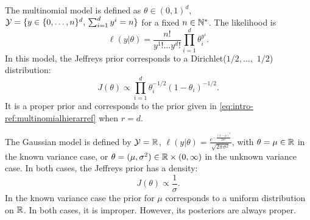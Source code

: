 \begin{ex}
    The multinomial model is defined as $\theta\in(0,1)^d$, $\mathcal{Y}=\{y\in\{0,\dots,n\}^d,\,\sum_{i=1}^dy^i=n\} $ for a fixed $n\in\mathbb{N}^\ast$.
    The likelihood is 
        \begin{equation}
            \ell(y|\theta) = \frac{n!}{y^1!\dots y^d!}\prod_{i=1}^d\theta_i^{y^i}.
        \end{equation}
    In this model, the Jeffreys prior corresponds to a Dirichlet($1/2,\dots,$ $1/2$) distribution:
        \begin{equation}
            J(\theta)\propto \prod_{i=1}^d\theta_i^{-1/2}(1-\theta_i)^{-1/2}.
        \end{equation}
    It is a proper prior and corresponds to the prior given in \cref{eq:intro-ref:multinomialhierarref} when $r=d$.  
\end{ex}

\begin{ex}
    The Gaussian model is defined by $\mathcal{Y}=\mathbb{R}$, $\ell(y|\theta) = \frac{e^{-\frac{(x-\mu)^2}{2\sigma^2}}}{\sqrt{2\pi\sigma^2}} $, with $\theta=\mu\in\mathbb{R} $ in the known variance case, or $\theta=(\mu,\sigma^2)\in\mathbb{R}\times(0,\infty) $ in the unknown variance case.
    In both cases, the Jeffreys prior has a density:
        \begin{equation}
            J(\theta)\propto \frac{1}{\sigma}.
        \end{equation}    
    In the known variance case the prior for $\mu$ corresponds to a uniform distribution on $\mathbb{R}$. In both cases, it is improper.  However, its posteriors are always proper.
\end{ex}




